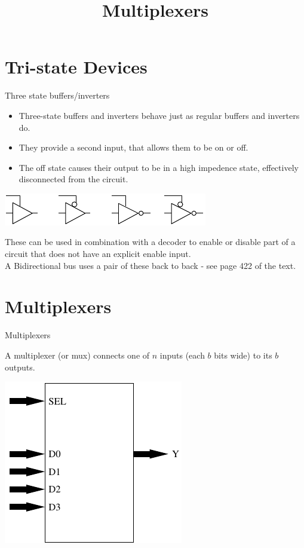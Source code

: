 \title{Multiplexers}

\section{Tri-state Devices}
\begin{frame}{Three state buffers/inverters}
  \begin{itemize}
    \item Three-state buffers and inverters behave just as regular buffers and inverters do.
    \item They provide a second input, that allows them to be on or off.
    \item The off state causes their output to be in a high impedence state, effectively disconnected from the circuit.
  \end{itemize}
  \begin{center}
    \includegraphics{TriStateLogic}
  \end{center}
\end{frame}

These can be used in combination with a decoder to enable or disable part of a circuit that does not have an explicit enable input. \\
A Bidirectional bus uses a pair of these back to back - see page 422 of the text.

\section{Multiplexers}

\begin{frame}{Multiplexers}
  \begin{definition}
    A \alert{multiplexer} (or mux) connects one of $n$ inputs (each $b$ bits wide) to its $b$ outputs.
  \end{definition}
  \begin{center}
    \includegraphics{multiplexer}
  \end{center}
\end{frame}

